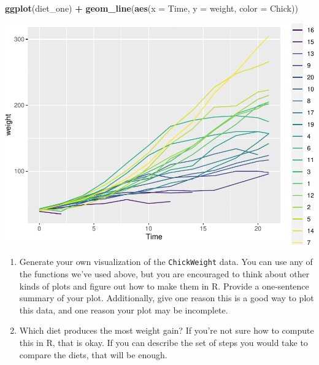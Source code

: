 \documentclass[]{article}
\newenvironment{Shaded}{\begin{snugshade}}{\end{snugshade}}
\newcommand{\DataTypeTok}[1]{\textcolor[rgb]{0.13,0.29,0.53}{#1}}
\newcommand{\KeywordTok}[1]{\textcolor[rgb]{0.13,0.29,0.53}{\textbf{#1}}}
\newcommand{\NormalTok}[1]{#1}
\newcommand{\OperatorTok}[1]{\textcolor[rgb]{0.81,0.36,0.00}{\textbf{#1}}}
\newcommand{\StringTok}[1]{\textcolor[rgb]{0.31,0.60,0.02}{#1}}
\begin{document}
\begin{Shaded}
\begin{Highlighting}[]
    \KeywordTok{ggplot}\NormalTok{(diet_one) }\OperatorTok{+}\StringTok{ }\KeywordTok{geom_line}\NormalTok{(}\KeywordTok{aes}\NormalTok{(}\DataTypeTok{x =}\NormalTok{ Time, }\DataTypeTok{y =}\NormalTok{ weight, }\DataTypeTok{color =}\NormalTok{ Chick))}
\end{Highlighting}
\end{Shaded}

\includegraphics{lab_01_template_files/figure-latex/unnamed-chunk-11-1.pdf}

\begin{enumerate}
\def\labelenumi{\arabic{enumi}.}
\setcounter{enumi}{10}
\item
  Generate your own visualization of the \texttt{ChickWeight} data. You
  can use any of the functions we've used above, but you are encouraged
  to think about other kinds of plots and figure out how to make them in
  R. Provide a one-sentence summary of your plot. Additionally, give one
  reason this is a good way to plot this data, and one reason your plot
  may be incomplete.
\item
  Which diet produces the most weight gain? If you're not sure how to
  compute this in R, that is okay. If you can describe the set of steps
  you would take to compare the diets, that will be enough.
\end{enumerate}
\end{document}
